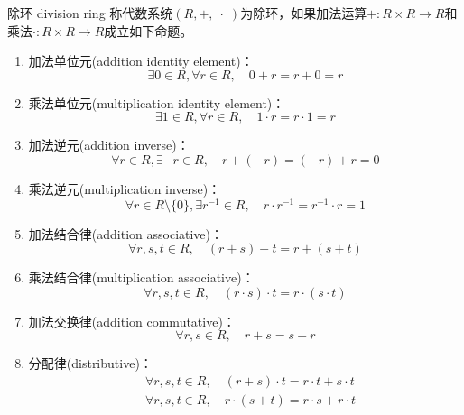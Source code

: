 \begin{definition}{除环 division ring}
	称代数系统$(R,+,\;\cdot\;)$为除环，如果加法运算$+:R\times R\to R$和乘法$\cdot :R\times R\to R$成立如下命题。
	\begin{enumerate}
		\item 加法单位元(addition identity element)：
		$$
		\exists 0\in R,\forall r\in R,\quad 0+r=r+0=r
		$$
		\item 乘法单位元(multiplication identity element)：
		$$
		\exists 1\in R,\forall r\in R,\quad 1\cdot r=r\cdot 1=r
		$$
		\item 加法逆元(addition inverse)：
		$$
		\forall r\in R,\exists-r\in R,\quad r+(-r)=(-r)+r=0
		$$
		\item 乘法逆元(multiplication inverse)：
		$$
		\forall r\in R\setminus\{0\},\exists r^{-1}\in R,\quad r\cdot r^{-1}=r^{-1}\cdot r=1
		$$
		\item 加法结合律(addition associative)：
		$$
		\forall r,s,t\in R,\quad (r+s)+t=r+(s+t)
		$$
		\item 乘法结合律(multiplication associative)：
		$$
		\forall r,s,t\in R,\quad (r\cdot s)\cdot t=r\cdot (s\cdot t)
		$$
		\item 加法交换律(addition commutative)：
		$$
		\forall r,s\in R,\quad r+s=s+r
		$$
		\item 分配律(distributive)：
		\begin{align*}
			&\forall r,s,t\in R,\quad (r+s)\cdot t=r\cdot t+s\cdot t\\
			&\forall r,s,t\in R,\quad r\cdot(s+t)=r\cdot s+r\cdot t
		\end{align*}
	\end{enumerate}
\end{definition}

